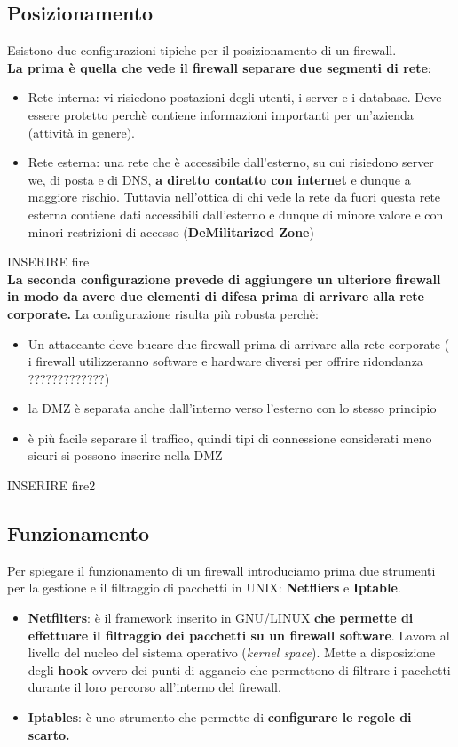 \documentclass[12pt]{article}
\begin{document}
		\subsection{Posizionamento}
			Esistono due configurazioni tipiche per il posizionamento di un firewall.\\
			\textbf{La prima è quella che vede il firewall separare due segmenti di rete}:
			\begin{itemize}
				\item Rete interna: vi risiedono postazioni degli utenti, i server e i database. Deve essere protetto perchè contiene informazioni importanti per un'azienda (attività in genere).
				\item Rete esterna: una rete che è accessibile dall'esterno, su cui risiedono server we, di posta e di DNS, \textbf{a diretto contatto con internet} e dunque a maggiore rischio. Tuttavia nell'ottica di chi vede la rete da fuori questa rete esterna contiene dati accessibili dall'esterno e dunque di minore valore e con minori restrizioni di accesso (\textbf{DeMilitarized Zone})
			\end{itemize}
			
			INSERIRE fire\\
			
			\textbf{La seconda configurazione prevede di aggiungere un ulteriore firewall in modo da avere due elementi di difesa prima di arrivare alla rete corporate.} La configurazione risulta più robusta perchè:
			\begin{itemize}
				\item Un attaccante deve bucare due firewall prima di arrivare alla rete corporate ( i firewall utilizzeranno software e hardware diversi per offrire ridondanza ?????????????)
				\item la DMZ è separata anche dall'interno verso l'esterno con lo stesso principio
				\item è più facile separare il traffico, quindi tipi di connessione considerati meno sicuri si possono inserire nella DMZ
			\end{itemize}
			
			INSERIRE fire2\\
			
		\subsection{Funzionamento}
			Per spiegare il funzionamento di un firewall introduciamo prima due strumenti per la gestione e il filtraggio di pacchetti in UNIX: \textbf{Netfliers} e \textbf{Iptable}.
			\begin{itemize}
				\item \textbf{Netfilters}: è il framework inserito in GNU/LINUX \textbf{che permette di effettuare il filtraggio dei pacchetti su un firewall software}. Lavora al livello del nucleo del sistema operativo (\textit{kernel space}). Mette a disposizione degli \textbf{hook} ovvero dei punti di aggancio che permettono di filtrare i pacchetti durante il loro percorso all'interno del firewall.
				\item \textbf{Iptables}: è uno strumento che permette di \textbf{configurare le regole di scarto.}
			\end{itemize}
			
\end{document}
